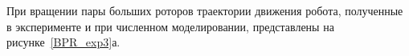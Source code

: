
При вращении пары больших роторов траектории движения робота, полученные в эксперименте и при численном моделировании, представлены на рисунке~\ref{BPR_exp3}а. %
